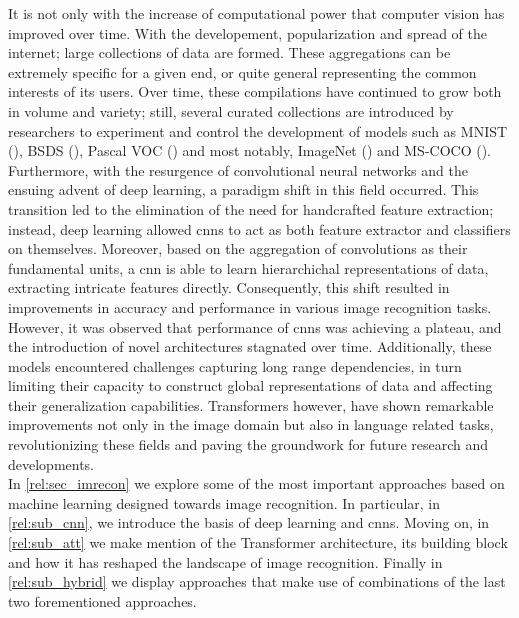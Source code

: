 \noindent It is not only with the increase of computational power that computer vision has improved 
over time. With the developement, popularization and spread of the internet; large collections of 
data are formed. These aggregations can be extremely specific for a given end, or quite general 
representing the common interests of its users. Over time, these compilations have continued to 
grow both in volume and variety; still, several curated collections are introduced by researchers 
to experiment and control the development of models such as MNIST (\cite{lecun1998gradient}), 
BSDS (\cite{MartinFTM01}), Pascal VOC (\cite{pascal-voc-2012}) and most notably, 
ImageNet (\cite{ILSVRC15}) and MS-COCO (\cite{lin2014microsoft}).\\

\noindent Furthermore, with the resurgence of convolutional neural networks and the ensuing advent 
of deep learning, a paradigm shift in this field occurred. This transition led to the elimination 
of the need for handcrafted feature extraction; instead, deep learning allowed \glspl{cnn} to act 
as both feature extractor and classifiers on themselves. Moreover, based on the aggregation of 
convolutions as their fundamental units, a \gls{cnn} is able to learn hierarchichal 
representations of data, extracting intricate features directly. 
Consequently, this shift resulted in improvements in accuracy and performance in various image 
recognition tasks. \\

\noindent However, it was observed that performance of \glspl{cnn} was achieving a plateau, and 
the introduction of novel architectures stagnated over time. Additionally, these models encountered 
challenges capturing long range dependencies, in turn  limiting their capacity to construct global 
representations of data and affecting their generalization capabilities. Transformers however, have 
shown remarkable improvements not only in the image domain but also in language related tasks, 
revolutionizing these fields and paving the groundwork for future research and developments.\\

\noindent In \autoref{rel:sec_imrecon} we explore some of the most important approaches based 
on machine learning designed towards image recognition. In particular, in \autoref{rel:sub_cnn}, we 
introduce the basis of deep learning and \glspl{cnn}. Moving on, in \autoref{rel:sub_att} we make 
mention of the Transformer architecture, its building block and how it has reshaped the landscape 
of image recognition. Finally in \autoref{rel:sub_hybrid} we display approaches that make use of 
combinations of the last two forementioned approaches.\\


